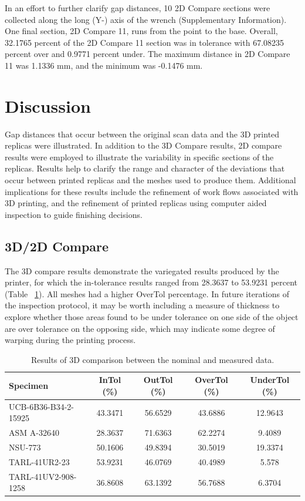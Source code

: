 \documentclass[review]{elsarticle}
\begin{document}
In an effort to further clarify gap distances, 10 2D Compare sections were collected along the long (Y-) axis of the wrench (Supplementary Information). One final section, 2D Compare 11, runs from the point to the base. Overall, 32.1765 percent of the 2D Compare 11 section was in tolerance with 67.08235 percent over and 0.9771 percent under. The maximum distance in 2D Compare 11 was 1.1336 mm, and the minimum was -0.1476 mm.

\section*{Discussion}

Gap distances that occur between the original scan data and the 3D printed replicas were illustrated. In addition to the 3D Compare results, 2D compare results were employed to illustrate the variability in specific sections of the replicas. Results help to clarify the range and character of the deviations that occur between printed replicas and the meshes used to produce them. Additional implications for these results include the refinement of work flows associated with 3D printing, and the refinement of printed replicas using computer aided inspection to guide finishing decisions.

\subsection*{3D/2D Compare}

The 3D compare results demonstrate the variegated results produced by the printer, for which the in-tolerance results ranged from 28.3637 to 53.9231 percent (Table ~\ref{tab:Tbl1}). All meshes had a higher OverTol percentage. In future iterations of the inspection protocol, it may be worth including a measure of thickness to explore whether those areas found to be under tolerance on one side of the object are over tolerance on the opposing side, which may indicate some degree of warping during the printing process. 

\begin{table}[tbh]\centering
\footnotesize
\caption{Results of 3D comparison between the nominal and measured data.}
\centering
\begin{tabular}{lcccc}
\hline
Specimen & InTol (\%) & OutTol (\%) & OverTol (\%) & UnderTol (\%)\\
\hline
UCB-6B36-B34-2-15925 & 43.3471 & 56.6529 & 43.6886 & 12.9643\\
ASM A-32640 & 28.3637 & 71.6363 & 62.2274 & 9.4089\\
NSU-773 & 50.1606 & 49.8394 & 30.5019 & 19.3374\\
TARL-41UR2-23 & 53.9231  & 46.0769 & 40.4989 & 5.578\\
TARL-41UV2-908-1258 & 36.8608 & 63.1392 & 56.7688 & 6.3704\\
\hline
\end{tabular}
\label{tab:Tbl1}
\end{table}
\end{document}
